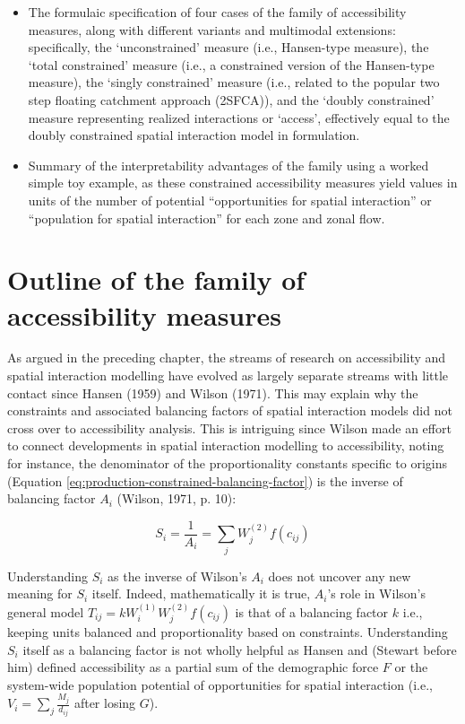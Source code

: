 \documentclass[
11pt, %
oneside, %
english, %
singlespacing, %
]{macthesis} %
\def\tightlist{}
\begin{document}
\begin{itemize}
\tightlist
\item
  The formulaic specification of four cases of the family of accessibility measures, along with different variants and multimodal extensions: specifically, the `unconstrained' measure (i.e., Hansen-type measure), the `total constrained' measure (i.e., a constrained version of the Hansen-type measure), the `singly constrained' measure (i.e., related to the popular two step floating catchment approach (2SFCA)), and the `doubly constrained' measure representing realized interactions or `access', effectively equal to the doubly constrained spatial interaction model in formulation.
\item
  Summary of the interpretability advantages of the family using a worked simple toy example, as these constrained accessibility measures yield values in units of the number of potential ``opportunities for spatial interaction'' or ``population for spatial interaction'' for each zone and zonal flow.
\end{itemize}

\section{Outline of the family of accessibility measures}\label{outline-of-the-family-of-accessibility-measures}

As argued in the preceding chapter, the streams of research on accessibility and spatial interaction modelling have evolved as largely separate streams with little contact since Hansen (1959) and Wilson (1971). This may explain why the constraints and associated balancing factors of spatial interaction models did not cross over to accessibility analysis. This is intriguing since Wilson made an effort to connect developments in spatial interaction modelling to accessibility, noting for instance, the denominator of the proportionality constants specific to origins (Equation \ref{eq:production-constrained-balancing-factor}) is the inverse of balancing factor \(A_i\) (Wilson, 1971, p. 10):

\begin{equation}
\label{eq:Ai-as-accessibility}
S_i = \frac{1}{A_i} = \sum_j W_j^{(2)} f(c_{ij})
\end{equation} 

Understanding \(S_i\) as the inverse of Wilson's \(A_i\) does not uncover any new meaning for \(S_i\) itself. Indeed, mathematically it is true, \(A_i\)'s role in Wilson's general model \(T_{ij} = k W_i^{(1)} W_j^{(2)} f(c_{ij})\) is that of a balancing factor \(k\) i.e., keeping units balanced and proportionality based on constraints. Understanding \(S_i\) itself as a balancing factor is not wholly helpful as Hansen and (Stewart before him) defined accessibility as a partial sum of the demographic force \(F\) or the system-wide population potential of opportunities for spatial interaction (i.e., \(V_i = \sum_j \frac{M_j}{d_{ij}}\) after losing \(G\)).
\end{document}
